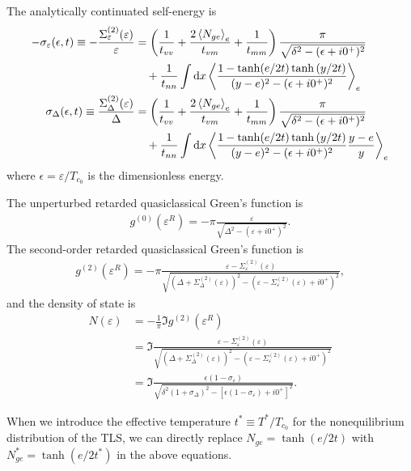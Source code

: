 \documentclass[aps,prl,preprint]{revtex4-2}
\begin{document}
The analytically continuated self-energy is
\begin{align}
    - \sigma_\varepsilon(\epsilon,t) \equiv -\frac{\Sigma^{(2)}_\varepsilon(\varepsilon)}{\varepsilon} & = \left(\frac{1}{t_{vv}} + \frac{2\ev{N_{ge}}_e}{t_{vm}} + \frac{1}{t_{mm}}\right)\frac{\pi}{\sqrt{\delta^2 - (\epsilon+i0^+)^2}} \nonumber \\
                                                                                                       & \quad + \frac{1}{t_{nn}}\int\dd x\ev{\frac{1-\tanh(e/2t)\tanh{(y/2t)}}{(y-e)^2 - (\epsilon+i0^+)^2}}_e \nonumber                            \\
    \sigma_\Delta(\epsilon,t) \equiv \frac{\Sigma^{(2)}_\Delta(\varepsilon)}{\Delta}                   & = \left(\frac{1}{t_{vv}} + \frac{2\ev{N_{ge}}_e}{t_{vm}} + \frac{1}{t_{mm}}\right)\frac{\pi}{\sqrt{\delta^2 - (\epsilon+i0^+)^2}} \nonumber \\
                                                                                                       & \quad + \frac{1}{t_{nn}}\int\dd x\ev{\frac{1-\tanh(e/2t)\tanh{(y/2t)}}{(y-e)^2 - (\epsilon+i0^+)^2}\frac{y-e}{y}}_e \nonumber               \\
\end{align}
where $\epsilon = \varepsilon / T_{c_0}$ is the dimensionless energy.

The unperturbed retarded quasiclassical Green's function is
\begin{align}
    g^{(0)}(\varepsilon^R)
    = -\pi\frac{\varepsilon}
    {\sqrt{\Delta^2 - (\varepsilon+i0^+)^2}}.
\end{align}
The second-order retarded quasiclassical Green's function is
\begin{align}
    g^{(2)}(\varepsilon^R)
    = -\pi\frac{\varepsilon - \Sigma^{(2)}_\varepsilon(\varepsilon)}
    {\sqrt{(\Delta + \Sigma^{(2)}_\Delta(\varepsilon))^2
            - (\varepsilon - \Sigma^{(2)}_\varepsilon(\varepsilon) + i0^+)^2}},
\end{align}
and the density of state is
\begin{align}
    N(\varepsilon)
     & = -\frac{1}{\pi}\Im{g^{(2)}(\varepsilon^R)}                                                                                   \\
     & = \Im{\frac{\varepsilon - \Sigma^{(2)}_\varepsilon(\varepsilon)}
        {\sqrt{(\Delta + \Sigma^{(2)}_\Delta(\varepsilon))^2
                - (\varepsilon - \Sigma^{(2)}_\varepsilon(\varepsilon) + i0^+)^2}}}                                                  \\
     & = \Im{\frac{\epsilon(1-\sigma_\varepsilon)}{\sqrt{\delta^2(1+\sigma_\Delta)^2 - [\epsilon(1-\sigma_\varepsilon) + i0^+]^2}}}.
\end{align}

When we introduce the effective temperature $t^* \equiv T^*/T_{c_0}$ for the nonequilibrium distribution of the TLS,
we can directly replace $N_{ge} = \tanh(e/2t)$
with $N_{ge}^* = \tanh(e/2t^*)$ in the above equations.
\end{document}
